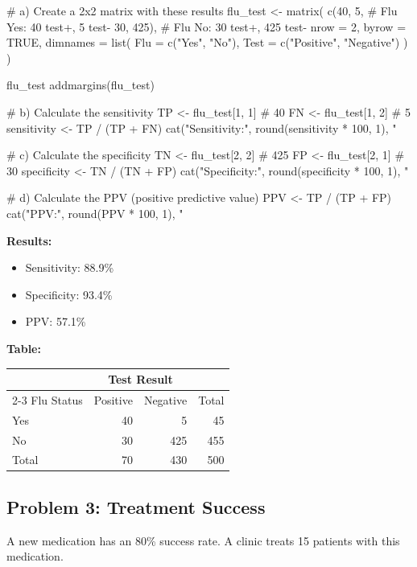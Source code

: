 \documentclass[11pt]{article}
\begin{document}
\begin{answerbox}
\begin{rcode}
# a) Create a 2x2 matrix with these results
flu_test <- matrix(
  c(40, 5,      # Flu Yes: 40 test+, 5 test-
    30, 425),   # Flu No: 30 test+, 425 test-
  nrow = 2,
  byrow = TRUE,
  dimnames = list(
    Flu = c("Yes", "No"),
    Test = c("Positive", "Negative")
  )
)

flu_test
addmargins(flu_test)

# b) Calculate the sensitivity
TP <- flu_test[1, 1]  # 40
FN <- flu_test[1, 2]  # 5
sensitivity <- TP / (TP + FN)
cat("Sensitivity:", round(sensitivity * 100, 1), "%

# c) Calculate the specificity
TN <- flu_test[2, 2]  # 425
FP <- flu_test[2, 1]  # 30
specificity <- TN / (TN + FP)
cat("Specificity:", round(specificity * 100, 1), "%

# d) Calculate the PPV (positive predictive value)
PPV <- TP / (TP + FP)
cat("PPV:", round(PPV * 100, 1), "%
\end{rcode}

\textbf{Results:}
\begin{itemize}
\item Sensitivity: 88.9\%
\item Specificity: 93.4\%
\item PPV: 57.1\%
\end{itemize}

\textbf{Table:}
\begin{center}
\begin{tabular}{lrrr}
\toprule
& \multicolumn{2}{c}{Test Result} & \\
\cmidrule{2-3}
Flu Status & Positive & Negative & Total \\
\midrule
Yes & 40 & 5 & 45 \\
No & 30 & 425 & 455 \\
\midrule
Total & 70 & 430 & 500 \\
\bottomrule
\end{tabular}
\end{center}
\end{answerbox}

\subsection{Problem 3: Treatment Success}

A new medication has an 80\% success rate. A clinic treats 15 patients with this medication.
\end{document}
